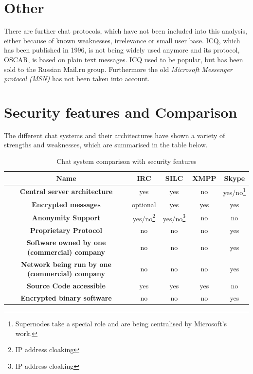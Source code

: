 \section{Other}
There are further chat protocols, which have not been included into this
analysis, either because of known weaknesses, irrelevance or small user base.
ICQ, which has been published in 1996, is not being widely used anymore
and its protocol, OSCAR\cite{oscar}, is based on plain text messages.
ICQ used to be popular, but has been sold to the Russian Mail.ru group.
Furthermore the old \textit{Microsoft Messenger protocol (MSN)} has not
been taken into account.
\section{Security features and Comparison}
The different chat systems and their architectures have shown a variety
of strengths and weaknesses, which are summarised in the table below.
\begin{longtable}{|c|c|c|c|c|}
\caption{Chat system comparison with security features}\\
\hline
\textbf{Name} & \textbf{IRC} & \textbf{SILC} & \textbf{XMPP} & \textbf{Skype}\\
\hline
\textbf{Central server architecture} & yes & yes & no & yes/no\footnote{Supernodes take a special role and are
being centralised by Microsoft's work.}\\
\hline
\textbf{Encrypted messages} & optional & yes & yes & yes\\
\hline
\textbf{Anonymity Support} & yes/no\footnote{IP address cloaking}  & yes/no\footnote{IP address cloaking} & no & no\\
\hline
\textbf{Proprietary Protocol} & no  & no & no & yes\\
\hline
\textbf{Software owned by one (commercial) company} & no  & no & no & yes\\
\hline
\textbf{Network being run by one (commercial) company} & no  & no & no & yes\\
\hline
\textbf{Source Code accessible} & yes  & yes & yes & no\\
\hline
\textbf{Encrypted binary software} & no  & no & no & yes\\
\hline
\end{longtable}
